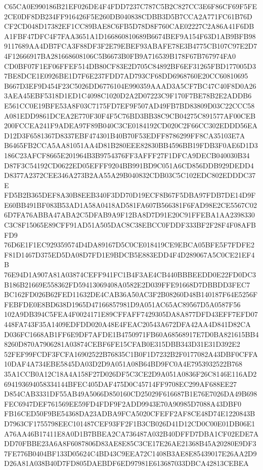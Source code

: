 \documentclass[UTF8,fontset=fandol,zihao=-4,a4paper]{ctexart}
\begin{document}
{{C65CA0E990186B21EF026DE4F4FDD7237C787C5B2C827CC3E6F86CF69F5FE2CE0DF8DB234FF916426F5E260DB040838CDBB3D5B7CCA2A771FC61B76D
CF2CD048D17382EF1CC89BAE8C6FB5D78D8F760CAE02227C2A86A41F6DBA1FBF47DFC4F7FAA3651A1D166860810689B6674BEF9A154F63D1AB9BFB98
9117689AA4DB7FCA3F88DF3F2E79EBEF93ABAFE78E3B4775CB107C97E2D74F12666917BA281668608106C5B6673B0FB9A716539B178F67B767974FA0
CD0BF07F1EF06FFEF514DB80CF83E2D705C84892BF6EF31265FBD177005D37BE8DCE1E0926BE1D7F6E237FDD7AD793CF68DD6968760E20CC60810695
B667D3EF9D454F23C5026DD6776104E990359AAAD3A5CF7BC47C40F8D0A263AEA45EBF5318D1ED1C4098C1020D2A2D07223C9F170F7BE78B2E2ADDB6
E561CC0E19BFE53A8F03C7175FD7EF9F507AD49FB7BD83809D03C22CCC58A081EDD9861DCEA2E770F30F4F5C76BD3BB38C9CB04275C891577AF00CEB
200FCCEA241F9ADEA97F89B040C3CE0184192CD020C2F66CC302EDDD56EAD12D3F6581367D8337EBF474301B40B70F53EDFF8786299FF8CA35103E7A
B6465FB2CCA5AA81051AA4D81B280EEE82830BB4596BB19FDB3F0AE6D1D3186C23AFCF8665E201964B3B9754376FF3AFFF27F1DFCA9DECB040030B34
D87F3C54192CD0622ED05EFFF9204BB991BD9C051A6CD856DDB929DEDD4D8377A2372CEE346A273B2AA55A29B040832CDB03C5C102EDC802EDDDC37E
FD5B2B365DEF8A30B8EEB340F3DD70D19ECF8B67F5DBA97FDB7DE14D9FE60BB491BF083B53AD1A58A0418AD581FA607B566381F6FAD98E2CE5567C02
6D7FA76ABBA47ABA2C5DFAB9A9F12BA8D7D91E20C91FFEBA1AA2398330C3C8F15065E89CFF91AD51A505DAC8C38EBCC0FDDF333BF2F28F4F08AFBFD9
76D6E1F1EC929359574D4DA89167D5C0CE018419CE9EBCA05BFE5F7FDFE2F81D1467D375ED5DA08D7FD1E9BDCB5E883EDD4F4D289067A5C0CE21EF4B
76E94D1A907A81A03874CEFF941FC1B4F3AE4CB440BBBEEDD0E22FD0DC3B186B21669E558362FD59413069408A0582E2D039FFE91668D7DBBDD3FEC7
BC162FD026B62FED11632DE4CAB36A50AC3F2B08260D48B140187F64E5256FFEBFDE0E8BD638D1965D47166857981D9A051AC65AC89567D5A0587F56
102A9DB394C5FEA4F0024171E89CFFAFF7429305DA8A877DFD43EFF7EFD07448FA743F35A1409EDFDD020A48E4FEAC20543A672DFA42AA4D841D82CA
D036FC1668AB1FF6E9DF7AFDE1B4750971FB60A68568917E7D0BA821615BB48260D870A7906281A03874CEBF6FE15CFAB0E315DBB343D31E31D392E2
52FEF99FCDF3FCFA16902522B76835C1B0F1D7232B2F0177082A43DBF0CFFA10DAF4A734EBE5845DA03D2D9A051A08B64BD9FC0A4E7953932522B768
35A1CCB0A12C18A4A158F27D026DF5C3CE2D9A051A0836F26C8146E116AD2694193694058334144BFEC405DAF475D0C45714FF9708EC299AF688EE27
D854CAB3331DF55AB49A5066D850160CD25029F616687B1E76E7026DA49B698FEC6947DEF761569EE59FD4FDF9F2ADD9943E70A90985D7088A43DBF0
FB16CED50F9BE54368DA23ADBA9FCA5020CFEFF2AF8CE48D74E1220843BD7963CF1755798EEC101487CEF93FF2F1B3CB026D41D12CD0C00E01DB06E1
A76AA46B17411E8A0D1B7BBEA2CA736487A032B40DFFD7DBA1CF02EDE7ADD70FBBE23A6A8F6087806D83AE8E85C3CE17E26AE21368B45A20280E9DF3
7FE776B0404BF133D05624C4BD43C9EEA72C1408B3AE8E85439017E26AA2D9D26A81A038B40D7FD805DAEBDF6ED97981E613687033DBCA42813CEBEA
}}
\end{document}

